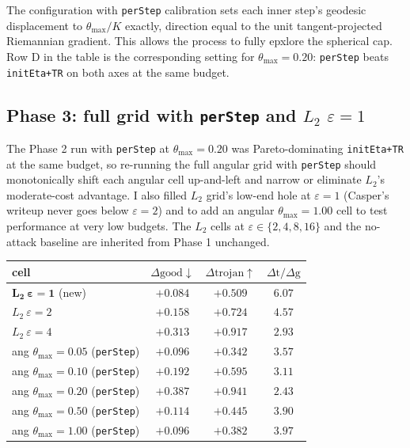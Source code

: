 \documentclass[11pt]{article}
\newcommand{\thmax}{\theta_{\max}}
\newcommand{\eps}{\varepsilon}
\begin{document}
The configuration with \texttt{perStep} calibration sets each inner step's geodesic displacement to $\thmax/K$ exactly, direction equal to the unit tangent-projected Riemannian gradient. This allows the process to fully epxlore the spherical cap. Row D in the table is the corresponding setting for $\thmax{=}0.20$: \texttt{perStep} beats \texttt{initEta+TR} on both axes at the same budget. 

\subsection{Phase 3: full grid with \texttt{perStep} and $L_2$ $\eps{=}1$}

The Phase 2 run with \texttt{perStep} at $\thmax{=}0.20$ was Pareto-dominating \texttt{initEta+TR} at the same budget, so re-running the full angular grid with \texttt{perStep} should monotonically shift each angular cell up-and-left and narrow or eliminate $L_2$'s moderate-cost advantage. I also filled $L_2$ grid's low-end hole at $\eps{=}1$ (Casper's writeup never goes below $\eps{=}2$) and to add an angular $\thmax{=}1.00$ cell to test performance at very low budgets. The $L_2$ cells at $\eps \in \{2, 4, 8, 16\}$ and the no-attack baseline are inherited from Phase 1 unchanged.

\begin{table}[h]
\centering\small
\begin{tabular}{lccc}
\toprule
\textbf{cell} & $\Delta\text{good}\downarrow$ & $\Delta\text{trojan}\uparrow$ & $\Delta\text{t}/\Delta\text{g}$ \\
\midrule
$\mathbf{L_2\ \eps{=}1}$ (new) & $\mathbf{+0.084}$ & $\mathbf{+0.509}$ & $\mathbf{6.07}$ \\
$L_2\ \eps{=}2$ & $+0.158$ & $+0.724$ & $4.57$ \\
$L_2\ \eps{=}4$ & $+0.313$ & $+0.917$ & $2.93$ \\
ang $\thmax{=}0.05$ (\texttt{perStep}) & $+0.096$ & $+0.342$ & $3.57$ \\
ang $\thmax{=}0.10$ (\texttt{perStep}) & $+0.192$ & $+0.595$ & $3.11$ \\
ang $\thmax{=}0.20$ (\texttt{perStep}) & $+0.387$ & $+0.941$ & $2.43$ \\
ang $\thmax{=}0.50$ (\texttt{perStep}) & $+0.114$ & $+0.445$ & $3.90$ \\
ang $\thmax{=}1.00$ (\texttt{perStep}) & $+0.096$ & $+0.382$ & $3.97$ \\
\bottomrule
\end{tabular}
\end{table}
\end{document}
